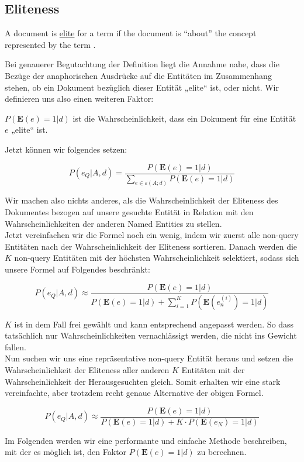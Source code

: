 \subsection{Eliteness}

\begin{defi}
	A document is \underline{elite} for a term if the document is ``about'' the concept represented by the term \cite{paper:Robertson}.
\end{defi}


Bei genauerer Begutachtung der Definition liegt die Annahme nahe, dass die Bezüge der anaphorischen Ausdrücke auf die Entitäten im Zusammenhang stehen, ob ein Dokument bezüglich dieser Entität „elite“ ist, oder nicht. Wir definieren uns also einen weiteren Faktor:

\begin{defi}
$P(\textbf{E}(e) = 1 | d)$ ist die Wahrscheinlichkeit, dass ein Dokument für eine Entität $e$ „elite“ ist.
\end{defi}

Jetzt können wir folgendes setzen:

\[ P(e_Q | A,d) = \frac{P(\textbf{E}(e) = 1 | d)}{\sum_{e \in \varepsilon (A;d)} P(\textbf{E}(e) = 1 | d)} \]

Wir machen also nichts anderes, als die Wahrscheinlichkeit der Eliteness des Dokumentes bezogen auf unsere gesuchte Entität in Relation mit den Wahrscheinlichkeiten der anderen Named Entities zu stellen.\\
Jetzt vereinfachen wir die Formel noch ein wenig, indem wir zuerst alle non-query Entitäten nach der Wahrscheinlichkeit der Eliteness sortieren. Danach werden die $K$ non-query Entitäten mit der höchsten Wahrscheinlichkeit selektiert, sodass sich unsere Formel auf Folgendes beschränkt:

\[ P(e_Q | A,d) \approx \frac{P(\textbf{E}(e) = 1 | d)}{P(\textbf{E}(e) = 1 | d) + \sum_{i=1}^{K} P(\textbf{E}(e_{n}^{(i)}) = 1 | d)} \]

$K$ ist in dem Fall frei gewählt und kann entsprechend angepasst werden. So dass tatsächlich nur Wahrscheinlichkeiten vernachlässigt werden, die nicht ins Gewicht fallen.\\
Nun suchen wir uns eine repräsentative non-query Entität heraus und setzen die Wahrscheinlichkeit der Eliteness aller anderen $K$ Entitäten mit der Wahrscheinlichkeit der Herausgesuchten gleich. Somit erhalten wir eine stark vereinfachte, aber trotzdem recht genaue Alternative der obigen Formel.

\[ P(e_Q | A,d) \approx \frac{P(\textbf{E}(e) = 1 | d)}{P(\textbf{E}(e) = 1 | d) + K \cdot P(\textbf{E}(e_N) = 1 | d)} \]


Im Folgenden werden wir eine performante und einfache Methode beschreiben, mit der es möglich ist, den Faktor $P(\textbf{E}(e) = 1 | d)$ zu berechnen.

